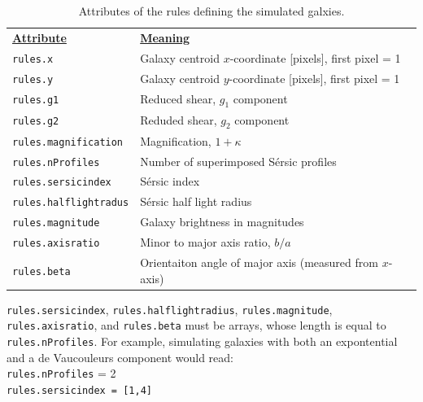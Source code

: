 \documentclass[12pt]{book}
\newcommand{\inline}{\\[0.4cm]}
\newcommand{\sersic}{S\'{e}rsic}
\begin{document}
\vspace{10pt}
\begin{longtabu} to \linewidth {l l}
\caption{Attributes of the rules defining the simulated galxies.} \label{tab:attr}\\
\underline{\textbf{Attribute}} & \underline{\textbf{Meaning}} \\
\texttt{rules.x} & Galaxy centroid $x$-coordinate [pixels], first pixel = 1\\
\texttt{rules.y} & Galaxy centroid $y$-coordinate [pixels], first pixel = 1\\
\texttt{rules.g1} & Reduced shear, $g_1$ component \\
\texttt{rules.g2} & Reduded shear, $g_2$ component \\
\texttt{rules.magnification} & Magnification, $1 + \kappa$ \\
\texttt{rules.nProfiles} & Number of superimposed \sersic{} profiles \\
\texttt{rules.sersicindex} & \sersic{} index \\
\texttt{rules.halflightradus} & \sersic{} half light radius \\
\texttt{rules.magnitude} & Galaxy brightness in magnitudes \\
\texttt{rules.axisratio} & Minor to major axis ratio, $b/a$ \\
\texttt{rules.beta} & Orientaiton angle of major axis (measured from $x$-axis)
\end{longtabu}

\noindent \texttt{rules.sersicindex}, \texttt{rules.halflightradius}, \texttt{rules.magnitude}, \texttt{rules.axisratio},
and \texttt{rules.beta} must be arrays, whose length is equal to \texttt{rules.nProfiles}. For example, simulating
galaxies with both an expontential and a de Vaucouleurs component would read:
\inline
\texttt{rules.nProfiles} = 2 \\
\texttt{rules.sersicindex = [1,4]}
\end{document}
